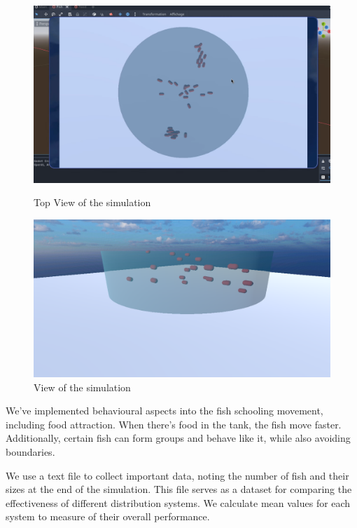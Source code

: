 \documentclass[9pt]{pnas-new}
\begin{document}
\begin{figure}[h]
    \centering
    \begin{minipage}[b]{0.45\linewidth}
        \includegraphics[width=\textwidth]{Capture.PNG}
        \caption{Top View of the simulation}
        \label{fig:Top view tankl}
    \end{minipage}
    \hspace{0.5cm}
    \begin{minipage}[b]{0.45\linewidth}
        \includegraphics[width=\textwidth]{poisson2.png}
        \caption{View of the simulation}
        \label{fig: basic view tankl}
    \end{minipage}
\end{figure}

We've implemented behavioural aspects into the fish schooling movement, including food attraction. When there's food in the tank, the fish move faster. Additionally, certain fish can form groups and behave like it, while also avoiding boundaries.

We use a text file to collect important data, noting the number of fish and their sizes at the end of the simulation. This file serves as a dataset for comparing the effectiveness of different distribution systems. We calculate mean values for each system to measure of their overall performance.   
\end{document}
